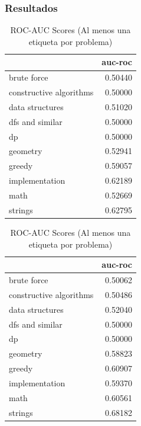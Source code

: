 \documentclass{article}
\begin{document}
\subsubsection{Resultados}
\begin{table}[ht!]
    \centering
    \begin{minipage}{0.45\textwidth}
        \centering
        \begin{tabular}{lr}
            \toprule
            {}                      & auc-roc  \\
            \midrule
            brute force             & 0.50440  \\
            constructive algorithms & 0.50000  \\
            data structures         & 0.51020  \\
            dfs and similar         & 0.50000  \\
            dp                      & 0.50000  \\
            geometry                & 0.52941  \\
            greedy                  & 0.59057  \\
            implementation          & 0.62189  \\
            math                    & 0.52669  \\
            strings                 & 0.62795  \\
            \bottomrule
        \end{tabular}
        \caption{ROC-AUC Scores}
	\label{ras}
    \end{minipage}%
    \hspace{0.05\textwidth} %
    \begin{minipage}{0.45\textwidth}
        \centering
        \begin{tabular}{lr}
            \toprule
            {}                      & auc-roc  \\
            \midrule
            brute force             & 0.50062  \\
            constructive algorithms & 0.50486  \\
            data structures         & 0.52040  \\
            dfs and similar         & 0.50000  \\
            dp                      & 0.50000  \\
            geometry                & 0.58823  \\
            greedy                  & 0.60907  \\
            implementation          & 0.59370  \\
            math                    & 0.60561  \\
            strings                 & 0.68182  \\
            \bottomrule
        \end{tabular}
        \caption{ROC-AUC Scores (Al menos una etiqueta por problema)}
	\label{rasc}
    \end{minipage}
\end{table}
\newpage
\end{document}

